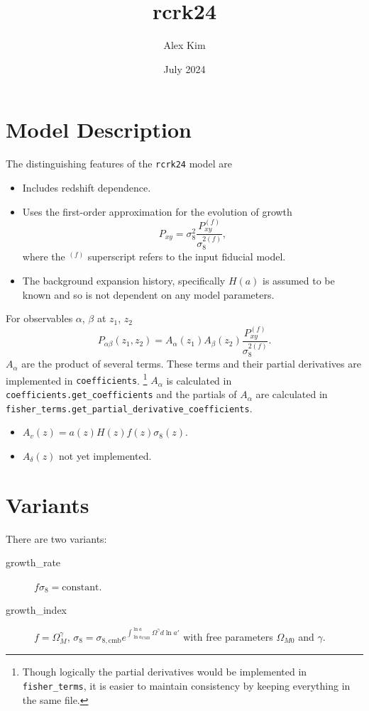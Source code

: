 \documentclass{article}
\title{rcrk24}
\author{Alex Kim}
\date{July 2024}
\begin{document}
 \maketitle

\section{Model Description}
The distinguishing features of the {\tt rcrk24} model are
\begin{itemize}
\item Includes redshift dependence.
\item Uses the first-order approximation for the evolution of growth
\begin{equation}
{P_{xy}} = {\sigma^2_8} \frac{P^{(f)}_{xy}}{\sigma^{2(f)}_8},
\end{equation}
where the ${}^{(f)}$ superscript refers to the input fiducial model.
\item
The background expansion history, specifically $H(a)$ is assumed to be known and so is not dependent
on any model parameters.
\end{itemize}

For observables $\alpha$, $\beta$ at $z_1$, $z_2$
\begin{equation}
P_{\alpha\beta}(z_1,z_2)= A_\alpha(z_1) A_\beta(z_2) \frac{P^{(f)}_{xy}}{\sigma^{2(f)}_8}.
\end{equation}
$A_\alpha$ are the product of several terms.
These terms and their partial derivatives are implemented in {\tt coefficients}.
\footnote{Though logically the partial derivatives would be implemented in
{\tt fisher\_terms}, it is easier to maintain consistency by keeping everything in the same file.}
$A_\alpha$ is calculated in {\tt coefficients.get\_coefficients} and the partials
of $A_\alpha$ are calculated in {\tt fisher\_terms.get\_partial\_derivative\_coefficients}.

\begin{itemize}
\item $A_v(z) = a(z)H(z)f(z)\sigma_8(z)$.
\item $A_\delta(z)$ not yet implemented.
\end{itemize}
\section{Variants}

There are two variants:
\begin{description}
\item[growth\_rate] $f\sigma_8=\text{constant}$.
\item[growth\_index] $f=\Omega_{M}^\gamma$, $\sigma_8  = \sigma_{8,\text{cmb}}  e^{\int^{\ln{a}}_{\ln{a_\text{CMB}}} \Omega^\gamma d\ln{a'}} $ with free parameters $\Omega_{M0}$ and $\gamma$.
\end{description}
\end{document}
